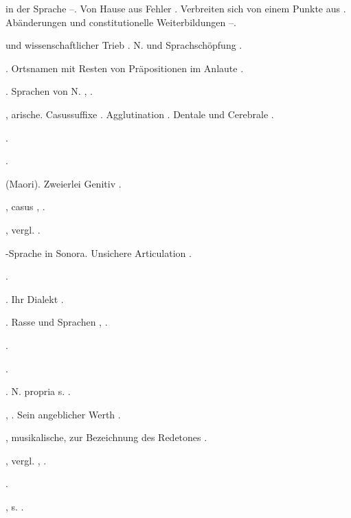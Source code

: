 \begin{register}
 in der Sprache \pageref{sp.126}–\pageref{sp.127}. Von Hause aus Fehler \pageref{sp.184}. Verbreiten sich von einem Punkte aus \pageref{sp.229}.  Abänderungen und constitutionelle Weiterbildungen \pageref{sp.428}–\pageref{sp.429}.

 und wissenschaftlicher Trieb \pageref{sp.17}. N. und Sprachschöpfung \pageref{sp.309}.

. Ortsnamen mit Resten von Präpositionen im Anlaute \pageref{sp.203}.

 \pageref{sp.147}. Sprachen von N. \pageref{sp.280}, \pageref{sp.282}.

, arische. Casussuffixe \pageref{sp.159}. Agglutination \pageref{sp.257}. Dentale und Cerebrale \pageref{sp.269}.

 \pageref{sp.165}.


 \pageref{sp.165}.

 (Maori). Zweierlei Genitiv \pageref{sp.463}.

, casus \pageref{sp.102}, \pageref{sp.151}.

, vergl. .

-Sprache in Sonora. Unsichere Articulation \pageref{sp.194}.

 \pageref{sp.157}.

. Ihr Dialekt \pageref{sp.190}.

. Rasse und Sprachen \pageref{sp.147}, \pageref{sp.177}.

 \pageref{sp.103}.

 \pageref{sp.115}.

. N. propria s. .

 \pageref{sp.102}, \sed{\pageref{sp.115},} \pageref{sp.354}. Sein angeblicher Werth \pageref{sp.392}.

, musikalische, zur Bezeichnung des Redetones \pageref{sp.377}.

, vergl. ,  \pageref{sp.103}.

 \pageref{sp.282}\sed{, \pageref{sp.426}}.

, s. .


\end{register}
